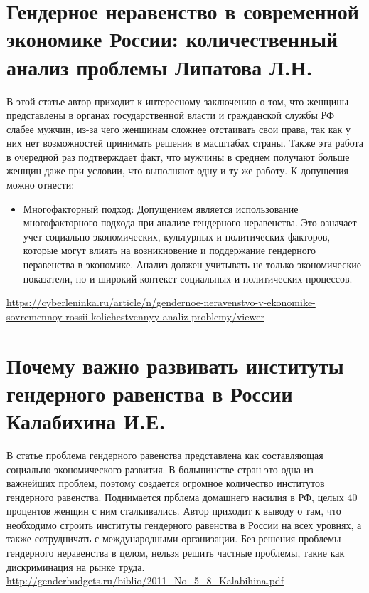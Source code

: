 \documentclass[a4paper,14pt]{article}
\begin{document}
\section{Гендерное неравенство в современной экономике России: количественный анализ проблемы Липатова Л.Н.}
В этой статье автор приходит к интересному заключению о том, что женщины представлены в органах государственной власти и гражданской службы РФ слабее мужчин, из-за чего женщинам сложнее отстаивать свои права, так как у них нет возможностей принимать решения в масштабах страны.  Также эта работа в очередной раз подтверждает факт, что мужчины в среднем получают больше женщин даже при условии, что выполняют одну и ту же работу. К допущения можно отнести:   

\begin{itemize}
    \item Многофакторный подход: Допущением является использование многофакторного подхода при анализе гендерного неравенства. Это означает учет социально-экономических, культурных и политических факторов, которые могут влиять на возникновение и поддержание гендерного неравенства в экономике. Анализ должен учитывать не только экономические показатели, но и широкий контекст социальных и политических процессов.
\end{itemize}
\url{https://cyberleninka.ru/article/n/gendernoe-neravenstvo-v-ekonomike-sovremennoy-rossii-kolichestvennyy-analiz-problemy/viewer}
\section{Почему важно развивать институты гендерного равенства в России Калабихина И.Е.}
В статье проблема гендерного равенства представлена как составляющая социально-экономического развития. В большинстве стран это одна из важнейших проблем, поэтому создается огромное количество институтов гендерного равенства. Поднимается прблема домашнего насилия в РФ, целых 40 процентов женщин с ним сталкивались. Автор приходит к выводу о там, что необходимо строить институты гендерного равенства в России на всех уровнях, а также сотрудничать с международными организации. Без решения проблемы гендерного неравенства в целом, нельзя решить частные проблемы, такие как дискриминация на рынке труда.
\url{http://genderbudgets.ru/biblio/2011_No_5_8_Kalabihina.pdf}
\end{document}
